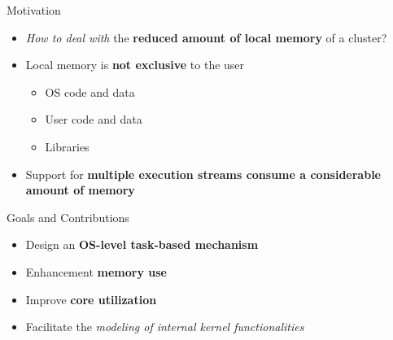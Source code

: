 	\begin{frame}{Motivation}
		\begin{itemize}
			\setlength\itemsep{5mm}
			\item \textit{How to deal with} the \textbf{reduced amount of local
				memory} of a cluster?
			\item Local memory is \textbf{not exclusive} to the user
			\begin{itemize}
				\item OS code and data
				\item User code and data
				\item Libraries
			\end{itemize}
			\item Support for \textbf{multiple execution streams consume
				a considerable amount of memory}
		\end{itemize}
	\end{frame}

	\begin{frame}{Goals and Contributions}
		\begin{itemize}
			\setlength\itemsep{5mm}
			\item Design an \textbf{OS-level task-based mechanism}
			\item Enhancement \textbf{memory use}
			\item Improve \textbf{core utilization}
			\item Facilitate the \textit{modeling of internal kernel
				functionalities}
		\end{itemize}
	\end{frame}

